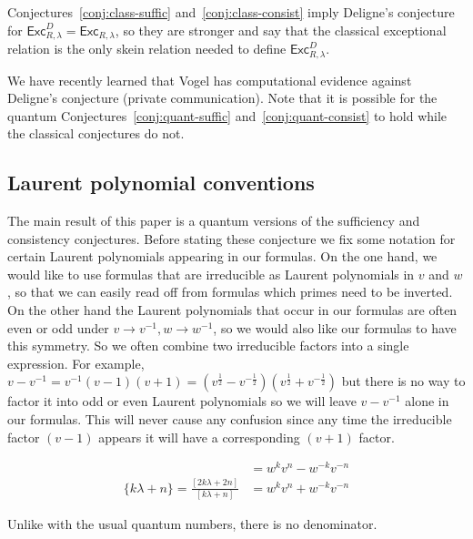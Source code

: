 \documentclass[12pt]{amsart}
\begin{document}
Conjectures~\ref{conj:class-suffic} and~\ref{conj:class-consist} imply
Deligne's conjecture for $\mathsf{Exc}^D_{R,\lambda} =
\mathsf{Exc}_{R,\lambda}$, so they are stronger and say that the
classical exceptional relation is the only skein relation needed to define
$\mathsf{Exc}^D_{R,\lambda}$.

\begin{remark}
  We have recently learned that Vogel has computational evidence against
  Deligne's conjecture (private communication). Note that it
  is possible for the quantum
  Conjectures~\ref{conj:quant-suffic} and~\ref{conj:quant-consist} to
  hold while the classical conjectures do not.
\end{remark}

\subsection{Laurent polynomial conventions}

The main result of this paper is a quantum versions of the sufficiency and
consistency conjectures.   Before stating these conjecture we fix some
notation for certain Laurent polynomials appearing in our formulas.  On the
one hand, we would like to use formulas that are irreducible as Laurent
polynomials in $v$ and $w$, so that we can easily read off from formulas which
primes need to be inverted.  On the other hand the Laurent polynomials that
occur in our formulas are often even or odd under $v \rightarrow v^{-1}, w
\rightarrow w^{-1}$, so we would also like our formulas to have this symmetry.
So we often combine two irreducible factors into a single expression.  For
example, $v-v^{-1} = v^{-1}(v-1)(v+1) =
(v^{\frac{1}{2}}-v^{-\frac{1}{2}})(v^{\frac{1}{2}}+v^{-\frac{1}{2}})$ but
there is no way to factor it into odd or even Laurent polynomials so we will
leave $v-v^{-1}$ alone in our formulas.  This will never cause any confusion
since any time the irreducible factor $(v-1)$ appears it will have a
corresponding $(v+1)$ factor.

\begin{align*}
[k\lambda + n] &= w^kv^n - w^{-k}v^{-n}\\
\{k\lambda + n\} = \frac{[2k\lambda + 2n]}{[k\lambda + n]} &= w^k v^n + w^{-k} v^{-n}
\end{align*}

\begin{warning}
Unlike with the usual quantum numbers, there is no denominator.
\end{warning}
\end{document}
